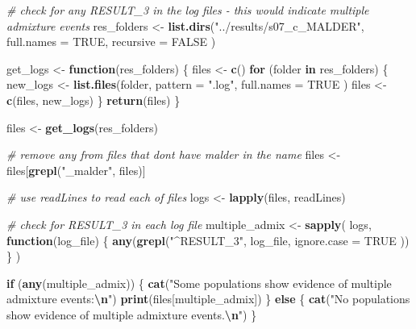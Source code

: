 \documentclass[
]{article}
\newenvironment{Shaded}{\begin{snugshade}}{\end{snugshade}}
\newcommand{\AttributeTok}[1]{\textcolor[rgb]{0.13,0.29,0.53}{#1}}
\newcommand{\CommentTok}[1]{\textcolor[rgb]{0.56,0.35,0.01}{\textit{#1}}}
\newcommand{\ConstantTok}[1]{\textcolor[rgb]{0.56,0.35,0.01}{#1}}
\newcommand{\ControlFlowTok}[1]{\textcolor[rgb]{0.13,0.29,0.53}{\textbf{#1}}}
\newcommand{\FunctionTok}[1]{\textcolor[rgb]{0.13,0.29,0.53}{\textbf{#1}}}
\newcommand{\NormalTok}[1]{#1}
\newcommand{\OtherTok}[1]{\textcolor[rgb]{0.56,0.35,0.01}{#1}}
\newcommand{\SpecialCharTok}[1]{\textcolor[rgb]{0.81,0.36,0.00}{\textbf{#1}}}
\newcommand{\StringTok}[1]{\textcolor[rgb]{0.31,0.60,0.02}{#1}}
\begin{document}
\begin{Shaded}
\begin{Highlighting}[]
\CommentTok{\# check for any \textquotesingle{}RESULT\_3\textquotesingle{} in the log files {-} this would indicate multiple admixture events}
\NormalTok{res\_folders }\OtherTok{\textless{}{-}} \FunctionTok{list.dirs}\NormalTok{(}\StringTok{"../results/s07\_c\_MALDER"}\NormalTok{,}
  \AttributeTok{full.names =} \ConstantTok{TRUE}\NormalTok{,}
  \AttributeTok{recursive =} \ConstantTok{FALSE}
\NormalTok{)}

\NormalTok{get\_logs }\OtherTok{\textless{}{-}} \ControlFlowTok{function}\NormalTok{(res\_folders) \{}
\NormalTok{  files }\OtherTok{\textless{}{-}} \FunctionTok{c}\NormalTok{()}
  \ControlFlowTok{for}\NormalTok{ (folder }\ControlFlowTok{in}\NormalTok{ res\_folders) \{}
\NormalTok{    new\_logs }\OtherTok{\textless{}{-}} \FunctionTok{list.files}\NormalTok{(folder,}
      \AttributeTok{pattern =} \StringTok{".log"}\NormalTok{,}
      \AttributeTok{full.names =} \ConstantTok{TRUE}
\NormalTok{    )}
\NormalTok{    files }\OtherTok{\textless{}{-}} \FunctionTok{c}\NormalTok{(files, new\_logs)}
\NormalTok{  \}}
  \FunctionTok{return}\NormalTok{(files)}
\NormalTok{\}}

\NormalTok{files }\OtherTok{\textless{}{-}} \FunctionTok{get\_logs}\NormalTok{(res\_folders)}



\CommentTok{\# remove any from files that don\textquotesingle{}t have \textquotesingle{}malder\textquotesingle{} in  the name}
\NormalTok{files }\OtherTok{\textless{}{-}}\NormalTok{ files[}\FunctionTok{grepl}\NormalTok{(}\StringTok{"\_malder"}\NormalTok{, files)]}

\CommentTok{\# use readLines to read each of files}
\NormalTok{logs }\OtherTok{\textless{}{-}} \FunctionTok{lapply}\NormalTok{(files, readLines)}

\CommentTok{\# check for \textquotesingle{}RESULT\_3\textquotesingle{} in each log file}
\NormalTok{multiple\_admix }\OtherTok{\textless{}{-}} \FunctionTok{sapply}\NormalTok{(}
\NormalTok{  logs,}
  \ControlFlowTok{function}\NormalTok{(log\_file) \{}
    \FunctionTok{any}\NormalTok{(}\FunctionTok{grepl}\NormalTok{(}\StringTok{"\^{}RESULT\_3"}\NormalTok{,}
\NormalTok{      log\_file,}
      \AttributeTok{ignore.case =} \ConstantTok{TRUE}
\NormalTok{    ))}
\NormalTok{  \}}
\NormalTok{)}

\ControlFlowTok{if}\NormalTok{ (}\FunctionTok{any}\NormalTok{(multiple\_admix)) \{}
  \FunctionTok{cat}\NormalTok{(}\StringTok{"Some populations show evidence of multiple admixture events:}\SpecialCharTok{\textbackslash{}n}\StringTok{"}\NormalTok{)}
  \FunctionTok{print}\NormalTok{(files[multiple\_admix])}
\NormalTok{\} }\ControlFlowTok{else}\NormalTok{ \{}
  \FunctionTok{cat}\NormalTok{(}\StringTok{"No populations show evidence of multiple admixture events.}\SpecialCharTok{\textbackslash{}n}\StringTok{"}\NormalTok{)}
\NormalTok{\}}
\end{Highlighting}
\end{Shaded}
\end{document}
